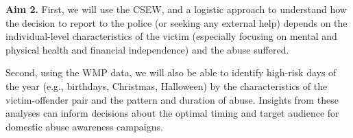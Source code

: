 \documentclass[11pt, a4paper]{article}
\begin{document}



\textbf{Aim 2.} First, we will use the CSEW, and a logistic approach to understand how the decision to report to the police (or seeking any external help) depends on the individual-level characteristics of the victim (especially focusing on mental and physical health and financial independence) and the abuse suffered. 

Second, using the WMP data, we will also be able to identify high-risk days of the year (e.g., birthdays, Christmas, Halloween) by the characteristics of the victim-offender pair and the pattern and duration of abuse. Insights from these analyses can inform decisions about the optimal timing and target audience for domestic abuse awareness campaigns. 






\end{document}
